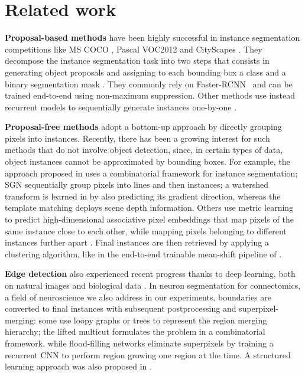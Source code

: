 
\section{Related work} \label{sec:related_work}
\textbf{Proposal-based methods} have been highly successful in instance segmentation competitions like MS COCO \cite{lin2014microsoft}, Pascal VOC2012 \cite{everingham2010pascal} and CityScapes \cite{cordts2016cityscapes}. They decompose the instance segmentation task into two steps that consists in generating object proposals and assigning to each bounding box a class and a binary segmentation mask \cite{he2017mask,liu2018path,yang2012layered,li2017fully,ladicky2010and,hariharan2014simultaneous,chen2015multi,dai2016instance,liang2016reversible}. 
They commonly rely on {Faster-RCNN}~\cite{ren2015faster} and can be trained end-to-end using non-maximum suppression. Other methods use instead recurrent models to sequentially generate instances one-by-one \cite{romera2016recurrent,ren2017end}.

\textbf{Proposal-free methods} adopt a bottom-up approach by directly grouping pixels into instances. Recently, there has been a growing interest for such  methods that do not involve object detection, since, in certain types of data, object instances cannot be approximated by bounding boxes. For example, the approach proposed in \cite{kirillov2017instancecut} uses a combinatorial framework for instance segmentation; SGN \cite{liu2017sgn} sequentially group pixels into lines and then instances;
a watershed transform is learned in \cite{bai2017deep} by also predicting its gradient direction, whereas the template matching \cite{uhrig2016pixel} deploys scene depth information.
Others use metric learning to predict high-dimensional associative pixel embeddings that map pixels of the same instance close to each other, while mapping pixels belonging to different instances further apart \cite{fathi2017semantic,newell2017associative,de2017semantic,kulikov2018instance}. 
Final instances are then retrieved by applying a clustering algorithm, like in the end-to-end trainable mean-shift pipeline of \cite{kong2018recurrentPix}.

\textbf{Edge detection} also experienced recent progress thanks to deep learning, both on natural images \cite{xie2015holistically,kokkinos2015pushing} and biological data \cite{lee2017superhuman,schmidt2018cell,meirovitch2016multi,ciresan2012deep}. In neuron segmentation for connectomics, a field of neuroscience we also address in our experiments, boundaries are converted to final instances with subsequent postprocessing and superpixel-merging:
some use loopy graphs \cite{kaynig2015large,krasowski2015improving} or trees \cite{meirovitch2016multi,liu2016sshmt,liu2014modular,funke2015learning,uzunbas2016efficient} to represent the region merging hierarchy; the lifted multicut \cite{beier2017multicut} formulates the problem in a combinatorial framework, while flood-filling networks \cite{januszewski2018high} eliminate superpixels by training a recurrent CNN to perform region growing one region at the time. A structured learning approach was also proposed in \cite{funke2018large,turaga2009maximin}.

